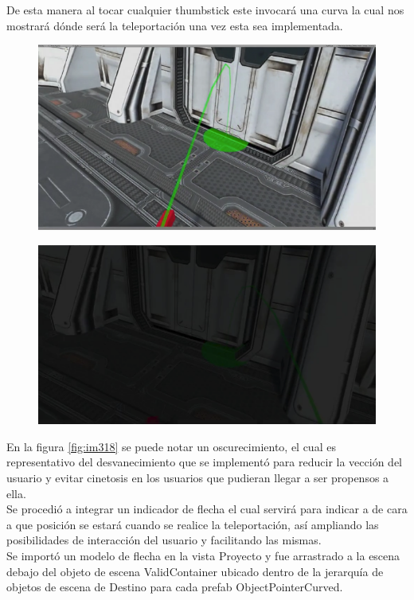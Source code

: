 De esta manera al tocar cualquier thumbstick este invocará una curva la cual nos mostrará dónde será la teleportación una vez esta sea implementada.\\
\begin{figure}[H]
	\begin{center}
 		\includegraphics[width = .5\textwidth]{source/images/image35.png}
	\end{center} 
\end{figure}
\begin{figure}[H]
	\begin{center}
 		\includegraphics[width = .5\textwidth]{source/images/image61.png}
	\end{center} 
\end{figure}

En la figura \ref{fig:im318} se puede notar un oscurecimiento, el cual es representativo del desvanecimiento que se implementó para reducir la vección del usuario y evitar cinetosis en los usuarios que pudieran llegar a ser propensos a ella.\\

Se procedió a integrar un indicador de flecha el cual servirá para indicar a de cara a que posición se estará cuando se realice la teleportación, así ampliando las posibilidades de interacción del usuario y facilitando las mismas.\\

Se importó un modelo de flecha en la vista Proyecto y fue arrastrado a la escena debajo del objeto de escena ValidContainer ubicado dentro de la jerarquía de objetos de escena de Destino para cada prefab ObjectPointerCurved.\\

